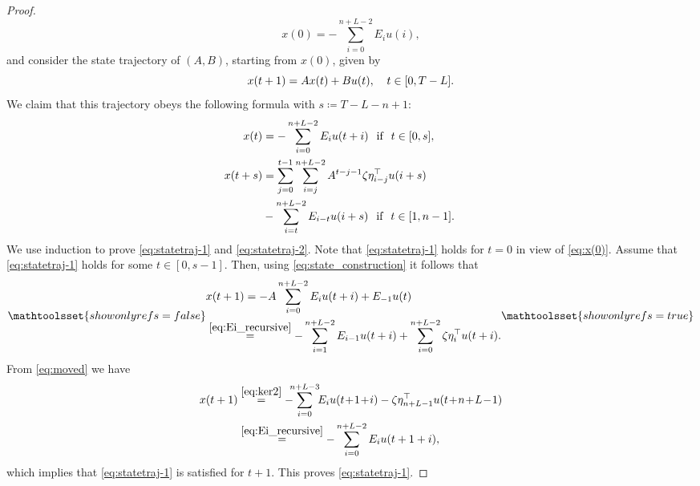 \documentclass[journal,twoside,web]{ieeecolor}
\begin{document}
\begin{proof}
\begin{equation}
x(0)=-\sum_{i=0}^{n+L-2} E_i u(i),
\end{equation}
and consider the state trajectory of $(A,B)$, starting from $x(0)$, given by
\begin{equation}
\label{eq:state_construction}
x(t+1)=Ax(t)+Bu(t),\ \hspace{0.25 cm} t\in[0,T-L].
\end{equation}
We claim that this trajectory obeys the following formula with $s\coloneqq T-L-n+1$:
\begin{subequations}
\label{eq:statetraj}
\begin{align}
\label{eq:statetraj-1}
\hspace{-0.75 cm} x(t)&=-\sum_{i=0}^{n+L-2} E_i u(t+i)\hspace{0.25 cm} \text{if}\hspace{0.25 cm} t\in[0,s], \\
\hspace{-0.75 cm} x(t+s)&=\sum_{j=0}^{t-1}\sum_{i=j}^{n+L-2} A^{t-j-1}\zeta\eta_{i-j}^\top u(i+s)\\
\label{eq:statetraj-2}
&-\sum_{i=t}^{n+L-2}E_{i-t} u(i+s)  \hspace{0.25 cm} \text{if}\hspace{0.25 cm} t\in[1,n-1].
\end{align}
\end{subequations}
We use induction to prove \eqref{eq:statetraj-1} and \eqref{eq:statetraj-2}. Note that \eqref{eq:statetraj-1} holds for $t=0$ in view of \eqref{eq:x(0)}. Assume that \eqref{eq:statetraj-1} holds for some $t\in[0,s-1]$. Then, using \eqref{eq:state_construction} it follows that
\begin{subequations}
\mathtoolsset{showonlyrefs=false}
\label{eq:moved}
\begin{align}
&x(t+1)=-A\sum_{i=0}^{n+L-2} E_i u(t+i)+E_{-1}u(t) \\
& \stackrel{\eqref{eq:Ei_recursive}}{=} -\sum_{i=1}^{n+L-2} E_{i-1} u(t+i)+\sum_{i=0}^{n+L-2} \zeta\eta_{i}^\top u(t+i).
\end{align}
\mathtoolsset{showonlyrefs=true}
\end{subequations}
From \eqref{eq:moved} we have
\begin{equation}
\begin{split}
x(t+1)&\stackrel{\eqref{eq:ker2}}{=} -\!\!\!\sum_{i=0}^{n+L-3} \!\! E_{i} u(t\!+\!1\!+\!i)-\zeta\eta_{n+L-1}^\top u(t\!+\!n\!+\!L\!-\!1) \\
&\stackrel{\eqref{eq:Ei_recursive}}{=} -\sum_{i=0}^{n+L-2} E_{i} u(t+1+i),
\end{split}
\end{equation}
which implies that \eqref{eq:statetraj-1} is satisfied for $t+1$. This proves \eqref{eq:statetraj-1}. 


\end{proof}
\end{document}
